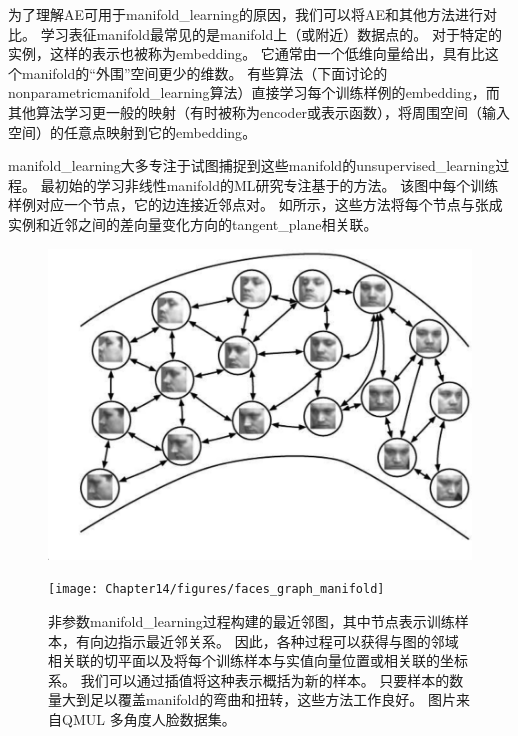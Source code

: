 
为了理解\gls{AE}可用于\gls{manifold_learning}的原因，我们可以将\gls{AE}和其他方法进行对比。
学习表征\gls{manifold}最常见的是\gls{manifold}上（或附近）数据点的。
对于特定的实例，这样的表示也被称为\gls{embedding}。
它通常由一个低维向量给出，具有比这个\gls{manifold}的``外围''空间更少的维数。
有些算法（下面讨论的\gls{nonparametric}\gls{manifold_learning}算法）直接学习每个训练样例的\gls{embedding}，而其他算法学习更一般的映射（有时被称为\gls{encoder}或表示函数），将周围空间（输入空间）的任意点映射到它的\gls{embedding}。


\gls{manifold_learning}大多专注于试图捕捉到这些\gls{manifold}的\gls{unsupervised_learning}过程。
最初始的学习非线性\gls{manifold}的\gls{ML}研究专注基于的方法。
该图中每个训练样例对应一个节点，它的边连接近邻点对。
如所示，这些方法\citep{Scholkopf98,Roweis2000-lle-small,Tenenbaum2000-isomap,Brand2003,Belkin+Niyogi-2003,Donoho+Carrie-03,Weinberger04a-small,SNE-nips15-small,VanDerMaaten08-small}将每个节点与张成实例和近邻之间的差向量变化方向的\gls{tangent_plane}相关联。

\begin{figure}[!htb]
\ifOpenSource
\centerline{\includegraphics[scale=0.5]{images/125.png}}
\else
\centerline{\texttt{[image: Chapter14/figures/faces\_graph\_manifold]}}
\fi
\caption{非参数\gls{manifold_learning}过程构建的最近邻图，其中节点表示训练样本，有向边指示最近邻关系。
因此，各种过程可以获得与图的邻域相关联的切平面以及将每个训练样本与实值向量位置或相关联的坐标系。
我们可以通过插值将这种表示概括为新的样本。
只要样本的数量大到足以覆盖\gls{manifold}的弯曲和扭转，这些方法工作良好。 
图片来自QMUL 多角度人脸数据集\citep{Gong-et-al-2000}。
}
\label{fig:chap14_faces_graph_manifold}
\end{figure}

